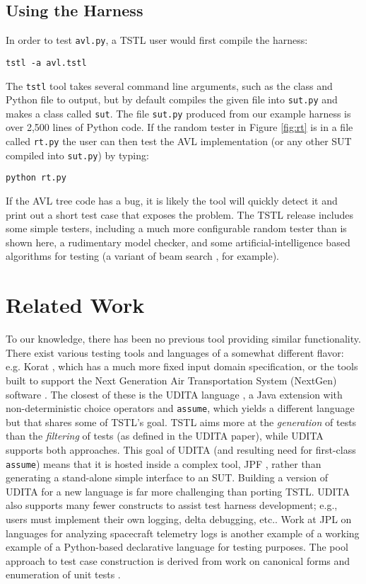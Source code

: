 \documentclass{sig-alternate}
\begin{document}
\subsection{Using the Harness}

In order to test {\tt avl.py},  a TSTL user would first compile the
harness:

\begin{verbatim}
tstl -a avl.tstl
\end{verbatim}

The {\tt tstl} tool takes several command line arguments, such as the
class and Python file to output, but by default compiles the given
file into {\tt sut.py} and makes a class called {\tt sut}.  The file
{\tt sut.py} produced from our example harness is over 2,500 lines of
Python code.  If the random tester in Figure \ref{fig:rt} is in a file called
{\tt rt.py} the user can then test the AVL implementation (or any
other SUT compiled into {\tt sut.py}) by typing:

\begin{verbatim}
python rt.py
\end{verbatim}

If the AVL tree code has a bug, it is likely the tool will quickly
detect it and print out a short test case that exposes the problem.
The TSTL release includes some simple testers, including a much more
configurable random tester than is shown here, a rudimentary model
checker, and some artificial-intelligence based algorithms for testing
(a variant of beam search \cite{NFM15}, for example).

\section{Related Work}


To our knowledge, there has been no previous tool providing similar
functionality.  
There exist various testing tools and languages of a somewhat
different flavor: e.g. Korat \cite{Korat}, which has a much more fixed
input domain specification, or the tools built to support the Next
Generation Air Transportation System (NextGen) software
\cite{TameInputs}.  The closest of these is the UDITA language
\cite{UDITA}, a Java extension with non-deterministic choice
operators and {\tt assume}, which yields a different language but
that shares some of TSTL's goal.  TSTL aims more at the \emph{generation} of
tests than the \emph{filtering} of tests (as defined in the UDITA
paper), while UDITA supports both approaches.  This goal of UDITA (and
resulting need for first-class {\tt assume}) means that it is hosted
inside a complex tool, JPF
\cite{JPF2}, rather than generating a stand-alone simple interface to
an SUT.  Building a version of UDITA for a new language is
far more challenging than porting TSTL.  UDITA also supports many fewer
constructs to assist test harness development; e.g., users must
implement their own logging, delta debugging, etc..
Work at JPL on languages for analyzing spacecraft telemetry
logs \cite{scriptstospecs} is another example of a working example of a
Python-based declarative language for testing purposes.  The pool
approach to test case construction is derived from work on canonical
forms and enumeration of unit tests \cite{AndrewsTR}.
\end{document}
